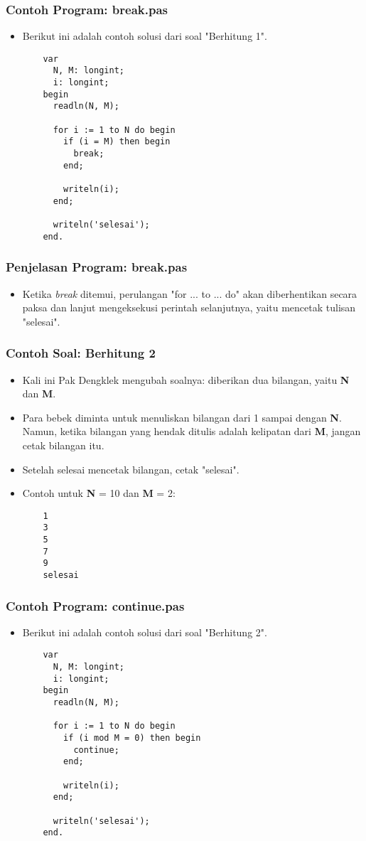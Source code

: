 \begin{frame}[fragile]
\frametitle{Contoh Program: break.pas}
\begin{itemize}
  \item Berikut ini adalah contoh solusi dari soal "Berhitung 1".
  \begin{lstlisting}
    var
      N, M: longint;
      i: longint;
    begin
      readln(N, M);

      for i := 1 to N do begin
        if (i = M) then begin
          break;
        end;

        writeln(i);
      end;

      writeln('selesai');
    end.
  \end{lstlisting}
\end{itemize}
\end{frame}

\begin{frame}
\frametitle{Penjelasan Program: break.pas}
\begin{itemize}
  \item Ketika \textit{break} ditemui, perulangan "for ... to ... do" akan diberhentikan secara paksa dan lanjut mengeksekusi perintah selanjutnya, yaitu mencetak tulisan "selesai".
\end{itemize}
\end{frame}

\begin{frame}[fragile]
\frametitle{Contoh Soal: Berhitung 2}
\begin{itemize}
  \item Kali ini Pak Dengklek mengubah soalnya: diberikan dua bilangan, yaitu \textbf{N} dan \textbf{M}.
  \item Para bebek diminta untuk menuliskan bilangan dari 1 sampai dengan \textbf{N}. Namun, ketika bilangan yang hendak ditulis adalah \alert{kelipatan} dari \textbf{M}, jangan cetak bilangan itu.
  \item Setelah selesai mencetak bilangan, cetak "selesai".
  \item Contoh untuk \textbf{N} = 10 dan \textbf{M} = 2:
  \begin{lstlisting}
    1
    3
    5
    7
    9
    selesai
  \end{lstlisting}
\end{itemize}
\end{frame}

\begin{frame}[fragile]
\frametitle{Contoh Program: continue.pas}
\begin{itemize}
  \item Berikut ini adalah contoh solusi dari soal "Berhitung 2".
  \begin{lstlisting}
    var
      N, M: longint;
      i: longint;
    begin
      readln(N, M);

      for i := 1 to N do begin
        if (i mod M = 0) then begin
          continue;
        end;

        writeln(i);
      end;

      writeln('selesai');
    end.
  \end{lstlisting}
\end{itemize}
\end{frame}

